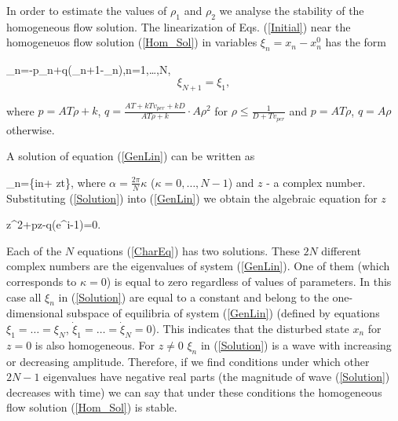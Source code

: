 \begin{figure*}
\label{1}

\centerline{
}
\vskip 0.3cm
\caption {(a) Fundamental diagram for $A=5,3,2(m/s^2)$ (top to bottom). Dashed
line corresponds to the homogeneous solution. (b) Ratio of variance of
velocities to the average velocity for $A=2,3,5(m/s^2)$ (top to bottom). (c)
Qualitative plot of function $S(\rho)$. (d),(e) Hysteresis loops in
transitions between free and fluctuative flow states for $A=3$ , arrows show
the direction of changing the global density. (f) Results of local
measurements of density and flux in free (almost straight line) and
fluctuative regimes.}

\end{figure*}


In order to estimate the values of $\rho_1$ and $\rho_2$ we analyse the
stability of the homogeneous flow  solution.
The linearization of Eqs. (\ref{Initial}) 
near the homogeneuos flow solution (\ref{Hom_Sol}) 
in variables $\xi_n = x_n - x_n^0$ has the form

\be
  \label{GenLin}
  \ddot\xi_n=-p\dot\xi_n+q(\xi_{n+1}-\xi_n),\quad n=1,\ldots,N,
\en
$$
\xi_{N+1}=\xi_1,
$$

where $p=AT\rho+k$, $q=\frac{AT+kTv_{per}+kD}{AT\rho+k}\cdot A\rho^2$
 for $\rho\leq\frac{1}{D+Tv_{per}}$ and 
$p=AT\rho$, $q=A\rho$ otherwise.

A solution of equation (\ref{GenLin}) can be written as

\be
 \label{Solution}
  \xi_n=\exp\{i\alpha n+ zt\},
\en
where $\alpha=\frac{2\pi}{N}\kappa$ ($\kappa=0,\ldots,N-1$) and $z$ - a
complex number. Substituting (\ref{Solution}) into (\ref{GenLin}) we obtain the
algebraic equation for $z$ 

\be
 \label{CharEq}
  z^2+pz-q(e^{i\alpha}-1)=0.
\en

Each of the $N$ equations (\ref{CharEq}) has two solutions. These $2N$
different complex numbers are the eigenvalues of system (\ref{GenLin}).
One of them (which corresponds to $\kappa=0$) is equal to zero regardless of
values of parameters. In this case all $\xi_n$ in (\ref{Solution})
are equal to a constant and belong to the
one-dimensional subspace of equilibria of system (\ref{GenLin}) (defined by
equations $\xi_1=\ldots=\xi_N$, $\dot\xi_1=\ldots=\dot\xi_N=0$).
This indicates that the disturbed state $x_n$ for $z=0$ is also
homogeneous. For $z\neq 0$ $\xi_n$ in (\ref{Solution}) is a wave with
increasing or decreasing amplitude. Therefore, if we find conditions under
which other $2N-1$ eigenvalues have negative real parts (the magnitude of wave
(\ref{Solution}) decreases with time) we can say that under these conditions
the homogeneous flow solution (\ref{Hom_Sol}) is stable. 


